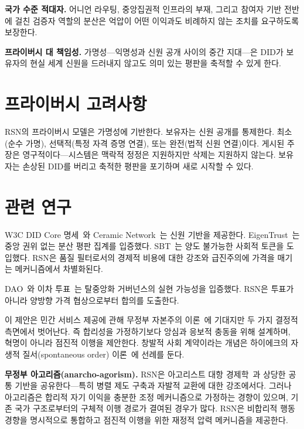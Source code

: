 \documentclass[11pt,a4paper,twocolumn]{article}
\begin{document}
\textbf{국가 수준 적대자.} 어니언 라우팅, 중앙집권적 인프라의 부재, 그리고 참여자 기반 전반에 걸친 검증자 역할의 분산은 억압이 어떤 이익과도 비례하지 않는 조치를 요구하도록 보장한다.

\textbf{프라이버시 대 책임성.} 가명성---익명성과 신원 공개 사이의 중간 지대---은 DID가 보유자의 현실 세계 신원을 드러내지 않고도 의미 있는 평판을 축적할 수 있게 한다.

\section{프라이버시 고려사항}

RSN의 프라이버시 모델은 가명성에 기반한다. 보유자는 신원 공개를 통제한다. 최소(순수 가명), 선택적(특정 자격 증명 연결), 또는 완전(법적 신원 연결)이다. 게시된 주장은 영구적이다---시스템은 맥락적 정정은 지원하지만 삭제는 지원하지 않는다. 보유자는 손상된 DID를 버리고 축적한 평판을 포기하며 새로 시작할 수 있다.

\section{관련 연구}

W3C DID Core 명세~\cite{did2022}와 Ceramic Network~\cite{ceramic2023}는 신원 기반을 제공한다. EigenTrust~\cite{kamvar2003}는 중앙 권위 없는 분산 평판 집계를 입증했다. SBT~\cite{weyl2022}는 양도 불가능한 사회적 토큰을 도입했다. RSN은 품질 필터로서의 경제적 비용에 대한 강조와 급진주의에 가격을 매기는 메커니즘에서 차별화된다.

DAO~\cite{buterin2014}와 이차 투표~\cite{buterin2019}는 탈중앙화 거버넌스의 실현 가능성을 입증했다. RSN은 투표가 아니라 양방향 가격 협상으로부터 합의를 도출한다.

이 제안은 민간 서비스 제공에 관해 무정부 자본주의 이론~\cite{rothbard1973,hoppe2001}에 기대지만 두 가지 결정적 측면에서 벗어난다. 즉 합리성을 가정하기보다 앙심과 응보적 충동을 위해 설계하며, 혁명이 아니라 점진적 이행을 제안한다. 창발적 사회 계약이라는 개념은 하이에크의 자생적 질서(spontaneous order) 이론~\cite{hayek1973}에 선례를 둔다.

\textbf{무정부 아고리즘(anarcho-agorism).} RSN은 아고리스트 대항 경제학~\cite{konkin2006}과 상당한 공통 기반을 공유한다---특히 병렬 제도 구축과 자발적 교환에 대한 강조에서다. 그러나 아고리즘은 합리적 자기 이익을 충분한 조정 메커니즘으로 가정하는 경향이 있으며, 기존 국가 구조로부터의 구체적 이행 경로가 결여된 경우가 많다. RSN은 비합리적 행동 경향을 명시적으로 통합하고 점진적 이행을 위한 재정적 압력 메커니즘을 제공한다.
\end{document}
